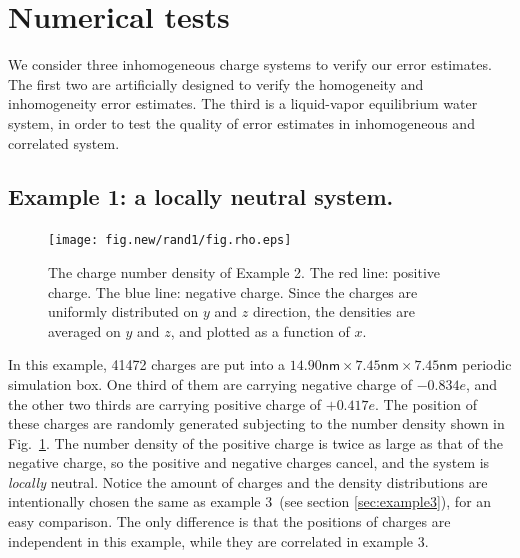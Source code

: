\documentclass[aps,pre,preprint,unsortedaddress]{revtex4}
\begin{document}
\section{Numerical tests}\label{sec:tmp3}

We consider three inhomogeneous charge systems to verify our error
estimates.
The first two are artificially designed to verify the 
homogeneity and inhomogeneity error estimates. The third is a 
liquid-vapor equilibrium water system, in order to test the
quality  of error estimates in inhomogeneous and correlated system.  


\subsection{Example 1: a locally neutral system.}
\label{sec:example1}

\begin{figure}
  \centering
  \texttt{[image: fig.new/rand1/fig.rho.eps]}
  \caption{
    The charge number density  of Example 2.
    The red line: positive charge. The blue line: negative charge.
    Since the charges are uniformly distributed
    on $y$ and $z$ direction, the densities are averaged on $y$ and $z$,
    and plotted as a
    function of $x$.
  }
  \label{fig:tmp-rho1}
\end{figure}

In this example,  41472 charges are put into a
$14.90\textsf{nm}\times 7.45\textsf{nm}\times 7.45\textsf{nm}$
periodic simulation box. One third of
them are carrying negative charge of $-0.834e$, and the other two thirds
are carrying positive charge of $+0.417e$.
The position of these charges
are randomly generated subjecting to the number density shown in
Fig.~\ref{fig:tmp-rho1}.  The number density of the  positive
charge   is twice as large as that of the negative charge,
so the
positive and negative charges cancel, and the
system is \emph{locally} neutral. Notice the amount of charges
and the density distributions are intentionally chosen the same as
example 3~(see section \ref{sec:example3}), 
for an easy comparison.  The only difference is that the positions
of charges are independent  in this example,
while they are correlated in example 3.
\end{document}
